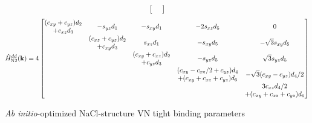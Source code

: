 \documentclass[twocolumn,showpacs,preprintnumbers,superscriptaddress,prb,floatfix,aps,10pt]{revtex4-1}
\renewcommand{\vec}[1]{\ensuremath{\mathbf{#1}}}
\newcommand*{\ham}{\hat{H}}
\begin{document}
\begin{widetext}
\begin{equation}
\begin{bmatrix}
\end{bmatrix}
\end{equation}
%
\begin{equation}
\ham_{\textrm{N2}}^{dd}(\vec{k})=4
\begin{bmatrix}
(c_{xy}+c_{yz})d_{2} & \multirow{2}{*}{$-s_{yz}d_{1}$} & \multirow{2}{*}{$-s_{xy}d_{1}$} & \multirow{2}{*}{$-2s_{xz}d_{5}$} & \multirow{2}{*}{$0$}\\
+c_{xz}d_{3}         &                                 &                                 &                                  & \\
\multirow{2}{*}{ }   & (c_{xz}+c_{yz})d_{2}            & \multirow{2}{*}{$s_{xz}d_{1}$}  & \multirow{2}{*}{$-s_{xy}d_{5}$}  & \multirow{2}{*}{$-\sqrt{3}s_{xy}d_{5}$}\\
                     & +c_{xy}d_{3}                    &                                 &                                  & \\
\multirow{2}{*}{ }   & \multirow{2}{*}{ }              & (c_{xy}+c_{xz})d_{2}            & \multirow{2}{*}{$-s_{yz}d_{5}$}  & \multirow{2}{*}{$\sqrt{3}s_{yz}d_{5}$}\\
                     &                                 & +c_{yz}d_{3}                    &                                  & \\
\multirow{2}{*}{ }   & \multirow{2}{*}{ }              & \multirow{2}{*}{ }              & (c_{xy}-c_{xz}/2+c_{yz})d_{4}    & \multirow{2}{*}{$-\sqrt{3}(c_{xy}-c_{yz})d_{4}/2$}\\
                     &                                 &                                 & +(c_{xy}+c_{xz}+c_{yz})d_{6}     & \\
\multirow{2}{*}{ }   & \multirow{2}{*}{ }              & \multirow{2}{*}{ }              & \multirow{2}{*}{ }               & 3c_{xz}d_{4}/2\\
                     &                                 &                                 &                                  & +(c_{xy}+c_{xz}+c_{yz})d_{6}\\
\end{bmatrix}
\end{equation}
%
\begin{table}[h]
\caption{\label{table:tbparameters} \emph{Ab initio}-optimized NaCl-structure VN tight binding parameters}
\setlength{\tabcolsep}{0.7em} %
{\renewcommand{\arraystretch}{1.5}%
}
\end{table}
\end{widetext}
\end{document}
